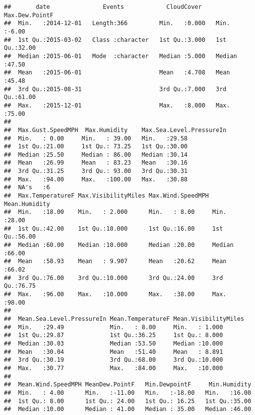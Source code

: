 \documentclass[]{article}
\begin{document}
\begin{verbatim}
##       date               Events            CloudCover    Max.Dew.PointF 
##  Min.   :2014-12-01   Length:366         Min.   :0.000   Min.   :-6.00  
##  1st Qu.:2015-03-02   Class :character   1st Qu.:3.000   1st Qu.:32.00  
##  Median :2015-06-01   Mode  :character   Median :5.000   Median :47.50  
##  Mean   :2015-06-01                      Mean   :4.708   Mean   :45.48  
##  3rd Qu.:2015-08-31                      3rd Qu.:7.000   3rd Qu.:61.00  
##  Max.   :2015-12-01                      Max.   :8.000   Max.   :75.00  
##                                                                         
##  Max.Gust.SpeedMPH  Max.Humidity    Max.Sea.Level.PressureIn
##  Min.   : 0.00     Min.   : 39.00   Min.   :29.58           
##  1st Qu.:21.00     1st Qu.: 73.25   1st Qu.:30.00           
##  Median :25.50     Median : 86.00   Median :30.14           
##  Mean   :26.99     Mean   : 83.23   Mean   :30.16           
##  3rd Qu.:31.25     3rd Qu.: 93.00   3rd Qu.:30.31           
##  Max.   :94.00     Max.   :100.00   Max.   :30.88           
##  NA's   :6                                                  
##  Max.TemperatureF Max.VisibilityMiles Max.Wind.SpeedMPH Mean.Humidity  
##  Min.   :18.00    Min.   : 2.000      Min.   : 8.00     Min.   :28.00  
##  1st Qu.:42.00    1st Qu.:10.000      1st Qu.:16.00     1st Qu.:56.00  
##  Median :60.00    Median :10.000      Median :20.00     Median :66.00  
##  Mean   :58.93    Mean   : 9.907      Mean   :20.62     Mean   :66.02  
##  3rd Qu.:76.00    3rd Qu.:10.000      3rd Qu.:24.00     3rd Qu.:76.75  
##  Max.   :96.00    Max.   :10.000      Max.   :38.00     Max.   :98.00  
##                                                                        
##  Mean.Sea.Level.PressureIn Mean.TemperatureF Mean.VisibilityMiles
##  Min.   :29.49             Min.   : 8.00     Min.   : 1.000      
##  1st Qu.:29.87             1st Qu.:36.25     1st Qu.: 8.000      
##  Median :30.03             Median :53.50     Median :10.000      
##  Mean   :30.04             Mean   :51.40     Mean   : 8.891      
##  3rd Qu.:30.19             3rd Qu.:68.00     3rd Qu.:10.000      
##  Max.   :30.77             Max.   :84.00     Max.   :10.000      
##                                                                  
##  Mean.Wind.SpeedMPH MeanDew.PointF   Min.DewpointF     Min.Humidity  
##  Min.   : 4.00      Min.   :-11.00   Min.   :-18.00   Min.   :16.00  
##  1st Qu.: 8.00      1st Qu.: 24.00   1st Qu.: 16.25   1st Qu.:35.00  
##  Median :10.00      Median : 41.00   Median : 35.00   Median :46.00  

\end{verbatim}
\end{document}
